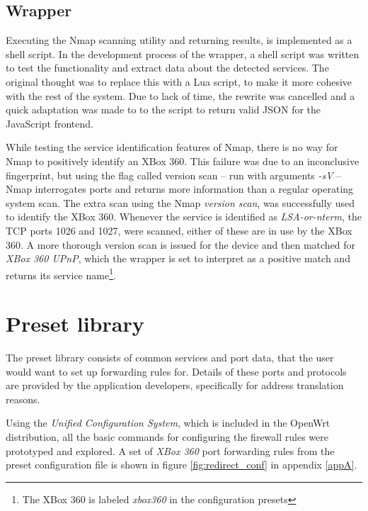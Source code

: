 \documentclass[a4paper,11pt,makeidx]{kth-bcs}
\begin{document}
\subsection{Wrapper}
Executing the Nmap scanning utility and returning results, is implemented as a shell script.
In the development process of the wrapper, a shell script was written to test the functionality and extract data about the detected services.
The original thought was to replace this with a Lua script, to make it more cohesive with the rest of the system.
Due to lack of time, the rewrite was cancelled and a quick adaptation was made to to the script to return valid JSON for the JavaScript frontend.

While testing the service identification features of Nmap, there is no way for Nmap to positively identify an XBox 360.
This failure was due to an inconclusive fingerprint, but using the flag called version scan -- run with arguments \emph{-sV} -- Nmap interrogates ports and returns more information than a regular operating system scan.
The extra scan using the Nmap \emph{version scan}, was successfully used to identify the XBox 360.
Whenever the service is identified as \emph{LSA-or-nterm}, the TCP ports 1026 and 1027, were scanned, either of these are in use by the XBox 360.\cite{aretheysecure}
A more thorough version scan is issued for the device and then matched for \emph{XBox 360 UPnP}, which the wrapper is set to interpret as a positive match and returns its service name\footnote{The XBox 360 is labeled \emph{xbox360} in the configuration presets}.

\section{Preset library}
The preset library consists of common services and port data, that the user would want to set up forwarding rules for.
Details of these ports and protocols are provided by the application developers, specifically for address translation reasons.

Using the \emph{Unified Configuration System}, which is included in the OpenWrt distribution, all the basic commands for configuring the firewall rules were prototyped and explored.
A set of \emph{XBox 360} port forwarding rules from the preset configuration file is shown in figure \ref{fig:redirect_conf} in appendix \ref{appA}.
\end{document}
